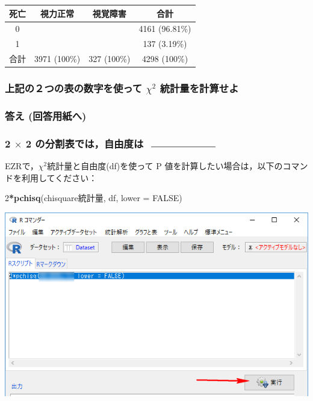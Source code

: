 \documentclass[11pt,]{problemset}
\newenvironment{Shaded}{\begin{snugshade}}{\end{snugshade}}
\newcommand{\DataTypeTok}[1]{\textcolor[rgb]{0.13,0.29,0.53}{#1}}
\newcommand{\DecValTok}[1]{\textcolor[rgb]{0.00,0.00,0.81}{#1}}
\newcommand{\KeywordTok}[1]{\textcolor[rgb]{0.13,0.29,0.53}{\textbf{#1}}}
\newcommand{\NormalTok}[1]{#1}
\newcommand{\OperatorTok}[1]{\textcolor[rgb]{0.81,0.36,0.00}{\textbf{#1}}}
\newcommand{\OtherTok}[1]{\textcolor[rgb]{0.56,0.35,0.01}{#1}}
\begin{document}
\begin{center}
\begin{tabular}{|c|c|c|c|}
\hline
死亡 & 視力正常                      & 視覚障害                   & 合計             \\ \hline
0  &                                 &                            &   4161 (96.81\%)        \\ \hline
1  &                                 &                            &  137 (3.19\%)    \\ \hline
合計 & 3971 (100\%)             & 327 (100\%)            & 4298 (100\%)   \\ \hline
\end{tabular}
\end{center}

\hypertarget{-chi2-}{%
\subsubsection{\texorpdfstring{上記の２つの表の数字を使って \(\chi^2\)
統計量を計算せよ}{上記の２つの表の数字を使って \textbackslash{}chi\^{}2 統計量を計算せよ}}\label{-chi2-}}

\hypertarget{--6}{%
\subsubsection{答え (回答用紙へ)}\label{--6}}

\hypertarget{times-2--rule3cm0.2mm}{%
\subsubsection{\texorpdfstring{2 \(\times\) 2 の分割表では，自由度は
\(\rule{3cm}{0.2mm}\)}{2 \textbackslash{}times 2 の分割表では，自由度は \textbackslash{}rule\{3cm\}\{0.2mm\}}}\label{times-2--rule3cm0.2mm}}

EZRで，\(\chi^2\)統計量と自由度(df)を使って P
値を計算したい場合は，以下のコマンドを利用してください：

\begin{Shaded}
\begin{Highlighting}[]
\DecValTok{2}\OperatorTok{*}\KeywordTok{pchisq}\NormalTok{(chisquare統計量, df, }\DataTypeTok{lower =} \OtherTok{FALSE}\NormalTok{)}
\end{Highlighting}
\end{Shaded}

\begin{center}\includegraphics[width=0.7\linewidth]{pic/mychisqtest02cut} \end{center}
\end{document}
